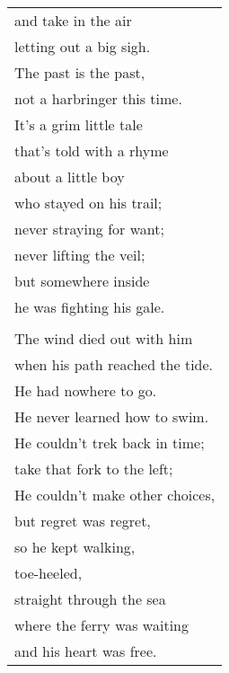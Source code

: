 \documentclass{article}
\begin{document}
\begin{center}
\begin{tabular}{l}
and take in the air \\
letting out a big sigh. \\
The past is the past, \\
not a harbringer this time. \\
It's a grim little tale \\
that's told with a rhyme \\
about a little boy \\
who stayed on his trail; \\
never straying for want; \\
never lifting the veil; \\
but somewhere inside \\
he was fighting his gale. \\
\\
The wind died out with him \\
when his path reached the tide. \\
He had nowhere to go. \\
He never learned how to swim. \\
He couldn't trek back in time; \\
take that fork to the left; \\
He couldn't make other choices, \\
but regret was regret, \\
so he kept walking, \\
toe-heeled, \\
straight through the sea \\
where the ferry was waiting \\
and his heart was free.
\end{tabular}
\end{center}
\end{document}
